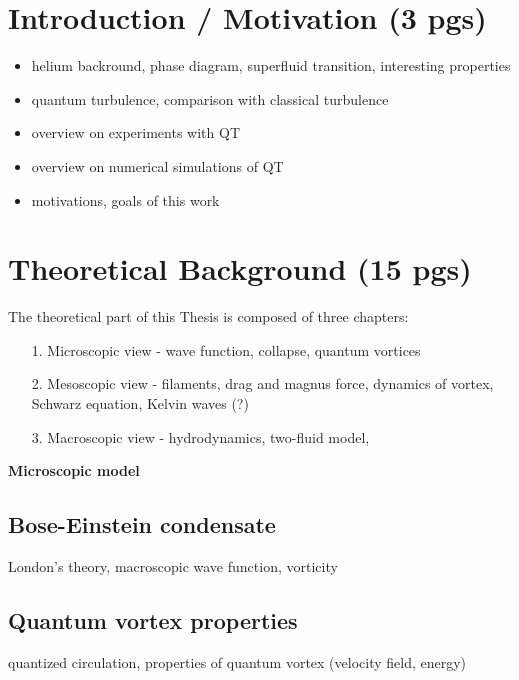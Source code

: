 \documentclass[a4paper, 12pt]{report}
\newcommand{\<}{\langle} %
\renewcommand{\>}{\rangle} %
\begin{document}
\pagestyle{plain}
\setcounter{page}{1}

\tableofcontents


\chapter*{Introduction / Motivation (3 pgs)}

\begin{itemize}
	\item helium backround, phase diagram, superfluid transition, interesting properties
	\item quantum turbulence, comparison with classical turbulence
	\item overview on experiments with QT
	\item overview on numerical simulations of QT
	\item motivations, goals of this work
\end{itemize}

\newpage
\chapter{Theoretical Background (15 pgs)}

The theoretical part of this Thesis is composed of three chapters:

\begin{itemize}
	\item[1.] Microscopic view - wave function, collapse, quantum vortices

	\item[2.] Mesoscopic view - filaments, drag and magnus force, dynamics of vortex, Schwarz equation, Kelvin waves (?)

	\item[3.] Macroscopic view - hydrodynamics, two-fluid model, 

\end{itemize}
\vspace{1cm}
{\Huge \bfseries Microscopic model}
\vspace{0.3cm}

\section{Bose-Einstein condensate}
London's theory, macroscopic wave function, vorticity

\section{Quantum vortex properties}
quantized circulation, properties of quantum vortex (velocity field, energy)
\end{document}
